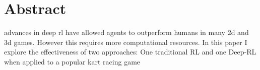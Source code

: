 
\chapter*{Abstract}
advances in deep rl have allowed agents to outperform humans in many 2d and 3d games. However this requires more computational resources. In this paper I explore the effectiveness of two approaches: One traditional RL and one Deep-RL when applied to a popular kart racing game
